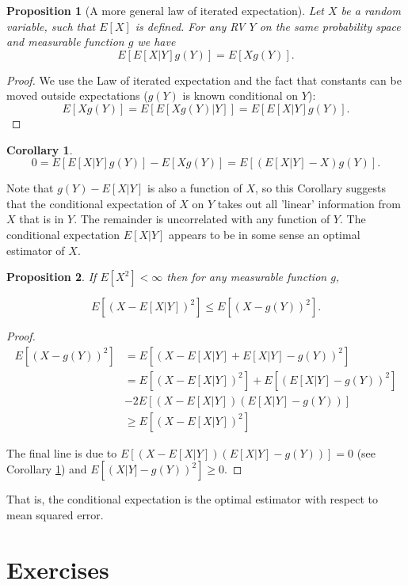 \documentclass{book}
\theoremstyle{plain}%
\newtheorem{corollary}{Corollary}[section]
\newtheorem{proposition}{Proposition}[section]
\theoremstyle{definition}
\begin{document}
%
\begin{proposition}[A more general law of iterated expectation]
Let $X$ be a random variable, such that $E[X]$ is defined. For any RV $Y$ on the same probability space and measurable function $g$ we have
$$E[E[X|Y]g(Y)] = E[Xg(Y)].$$
\end{proposition}

\begin{proof}
We use the Law of iterated expectation and the fact that constants can be moved outside expectations ($g(Y)$ is known conditional on $Y$):
$$ E[Xg(Y)] = E[E[Xg(Y)|Y]] = E[E[X|Y]g(Y)].$$
\end{proof}

\begin{corollary}
$$0 = E[E[X|Y]g(Y)] - E[Xg(Y)] = E[(E[X|Y] - X)g(Y)].$$\label{cor:uncorr}
\end{corollary}

Note that $g(Y) - E[X|Y]$ is also a function of $X$, so this Corollary suggests that the conditional expectation of $X$ on $Y$ takes out all 'linear' information from $X$ that is in $Y$. The remainder is uncorrelated with any function of $Y$. The conditional expectation $E[X|Y]$ appears to be in some sense an optimal estimator of $X$.

\begin{proposition}
If $E[X^2] < \infty$ then for any measurable function $g$,

$$E[(X - E[X|Y])^2] \leq E[(X - g(Y))^2].$$
\end{proposition}
\begin{proof}

\begin{align*}
    E[(X - g(Y))^2] &= E[(X - E[X|Y] + E[X|Y] - g(Y))^2]\\
    &= E[(X - E[X|Y])^2] + E[(E[X|Y] - g(Y))^2] \\
    &- 2E[(X - E[X|Y])(E[X|Y] - g(Y))]\\
    &\geq  E[(X - E[X|Y])^2]
\end{align*}

The final line is due to $E[(X - E[X|Y])(E[X|Y] - g(Y))] = 0$ (see Corollary \ref{cor:uncorr}) and $E[(X|Y] - g(Y))^2] \geq 0$.
\end{proof}

That is, the conditional expectation is the optimal estimator with respect to mean squared error.

\section*{Exercises}
\end{document}
